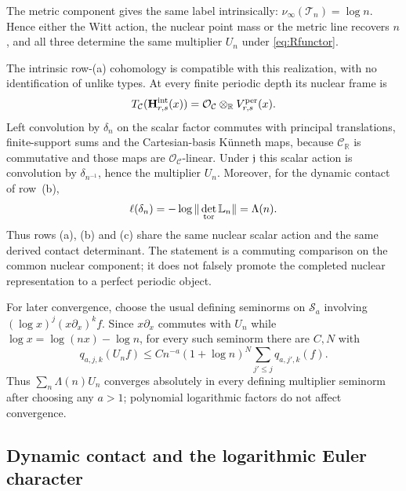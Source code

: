 \documentclass[11pt]{amsart}
\theoremstyle{definition}
\theoremstyle{remark}
\newcommand{\R}{\mathbb R}
\begin{document}
The metric component gives the same label intrinsically:
$\nu_\infty(\mathcal T_n)=\log n$.  Hence either the Witt action, the
nuclear point mass or the metric line recovers $n$, and all three determine
the same multiplier $U_n$ under \eqref{eq:Rfunctor}.

The intrinsic row-(a) cohomology is compatible with this realization, with
no identification of unlike types.  At every finite periodic depth its
nuclear frame is
\[
 T_{\mathcal C}(\mathbf H_{r,s}^{\rm int}(x))
 =\mathcal O_{\mathcal C}\otimes_\R V_{r,s}^{\rm per}(x).
\]
Left convolution by $\delta_n$ on the scalar factor commutes with principal
translations, finite-support sums and the Cartesian-basis K\"unneth maps,
because $\mathcal C_{\R}$ is commutative and those maps are
$\mathcal O_{\mathcal C}$-linear.  Under $\mathfrak j$ this scalar action is
convolution by $\delta_{n^{-1}}$, hence the multiplier $U_n$.  Moreover,
for the dynamic contact of row~(b),
\begin{equation}\label{eq:ABCcompatibility}
 \ell(\delta_n)
 =-\log\|\det_{\rm tor}\mathbb L_n\|
 =\Lambda(n).
\end{equation}
Thus rows (a), (b) and (c) share the same nuclear scalar action and the same
derived contact determinant.  The statement is a commuting comparison on
the common nuclear component; it does not falsely promote the completed
nuclear representation to a perfect periodic object.

For later convergence, choose the usual defining seminorms on
$\mathcal S_a$ involving $(\log x)^j(x\partial_x)^kf$.  Since $x\partial_x$
commutes with $U_n$ while
$\log x=\log(nx)-\log n$, for every such seminorm there are $C,N$ with
\begin{equation}\label{eq:Unestimate}
 q_{a,j,k}(U_nf)\leq Cn^{-a}(1+\log n)^N
   \sum_{j'\leq j}q_{a,j',k}(f).
\end{equation}
Thus $\sum_n\Lambda(n)U_n$ converges absolutely in every defining
multiplier seminorm after choosing any $a>1$; polynomial logarithmic factors
do not affect convergence.

\subsection{Dynamic contact and the logarithmic Euler character}
\end{document}
